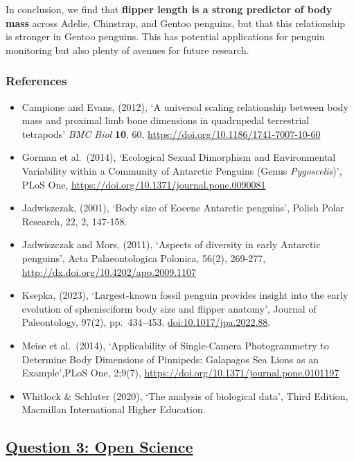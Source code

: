 \documentclass[
]{article}
\begin{document}
In conclusion, we find that \textbf{flipper length is a strong predictor
of body mass} across Adelie, Chinstrap, and Gentoo penguins, but that
this relationship is stronger in Gentoo penguins. This has potential
applications for penguin monitoring but also plenty of avenues for
future research.

\subsubsection{References}\label{references}

\begin{itemize}
\item
  Campione and Evans, (2012), `A universal scaling relationship between
  body mass and proximal limb bone dimensions in quadrupedal terrestrial
  tetrapods' \emph{BMC Biol} \textbf{10}, 60,
  \url{https://doi.org/10.1186/1741-7007-10-60}
\item
  Gorman et al.~(2014), `Ecological Sexual Dimorphism and Environmental
  Variability within a Community of Antarctic Penguins (Genus
  \emph{Pygoscelis})', PLoS One,
  \url{https://doi.org/10.1371/journal.pone.0090081}
\item
  Jadwiszczak, (2001), `Body size of Eocene Antarctic penguins', Polish
  Polar Research, 22, 2, 147-158.
\item
  Jadwiszczak and Mors, (2011), `Aspects of diversity in early Antarctic
  penguins', Acta Palaeontologica Polonica, 56(2), 269-277,
  \url{http://dx.doi.org/10.4202/app.2009.1107}
\item
  Ksepka, (2023), `Largest-known fossil penguin provides insight into
  the early evolution of sphenisciform body size and flipper anatomy',
  Journal of Paleontology, 97(2), pp.~434--453.
  \url{doi:10.1017/jpa.2022.88}.
\item
  Meise et al.~(2014), `Applicability of Single-Camera Photogrammetry to
  Determine Body Dimensions of Pinnipeds: Galapagos Sea Lions as an
  Example',PLoS One, 2;9(7),
  \url{https://doi.org/10.1371/journal.pone.0101197}
\item
  Whitlock \& Schluter (2020), `The analysis of biological data', Third
  Edition, Macmillan International Higher Education.
\end{itemize}

\subsection{\texorpdfstring{\ul{Question 3: Open
Science}}{Question 3: Open Science}}\label{question-3-open-science}
\end{document}
